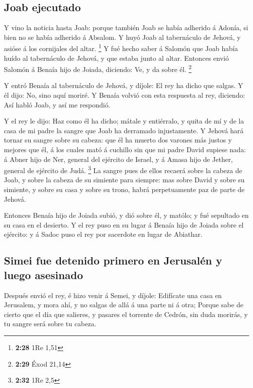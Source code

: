 \hypertarget{joab-ejecutado}{%
\subsection{Joab ejecutado}\label{joab-ejecutado}}

 Y vino la noticia hasta Joab: porque también Joab se
había adherido á Adonía, si bien no se había adherido á Absalom. Y huyó
Joab al tabernáculo de Jehová, y asióse á los cornijales del altar.
\footnote{\textbf{2:28} 1Re 1,51}  Y fué hecho saber á
Salomón que Joab había huído al tabernáculo de Jehová, y que estaba
junto al altar. Entonces envió Salomón á Benaía hijo de Joiada,
diciendo: Ve, y da sobre él. \footnote{\textbf{2:29} Éxod 21,14}

 Y entró Benaía al tabernáculo de Jehová, y díjole: El
rey ha dicho que salgas. Y él dijo: No, sino aquí moriré. Y Benaía
volvió con esta respuesta al rey, diciendo: Así habló Joab, y así me
respondió.

 Y el rey le dijo: Haz como él ha dicho; mátale y
entiérralo, y quita de mí y de la casa de mi padre la sangre que Joab ha
derramado injustamente.  Y Jehová hará tornar su sangre
sobre su cabeza: que él ha muerto dos varones más justos y mejores que
él, á los cuales mató á cuchillo sin que mi padre David supiese nada: á
Abner hijo de Ner, general del ejército de Israel, y á Amasa hijo de
Jether, general de ejército de Judá. \footnote{\textbf{2:32} 1Re 2,5}
 La sangre pues de ellos recaerá sobre la cabeza de Joab,
y sobre la cabeza de su simiente para siempre: mas sobre David y sobre
su simiente, y sobre su casa y sobre su trono, habrá perpetuamente paz
de parte de Jehová.

 Entonces Benaía hijo de Joiada subió, y dió sobre él, y
matólo; y fué sepultado en su casa en el desierto.  Y el
rey puso en su lugar á Benaía hijo de Joiada sobre el ejército: y á
Sadoc puso el rey por sacerdote en lugar de Abiathar.

\hypertarget{simei-fue-detenido-primero-en-jerusaluxe9n-y-luego-asesinado}{%
\subsection{Simei fue detenido primero en Jerusalén y luego
asesinado}\label{simei-fue-detenido-primero-en-jerusaluxe9n-y-luego-asesinado}}

 Después envió el rey, é hizo venir á Semei, y díjole:
Edifícate una casa en Jerusalem, y mora ahí, y no salgas de allá á una
parte ni á otra;  Porque sabe de cierto que el día que
salieres, y pasares el torrente de Cedrón, sin duda morirás, y tu sangre
será sobre tu cabeza.

